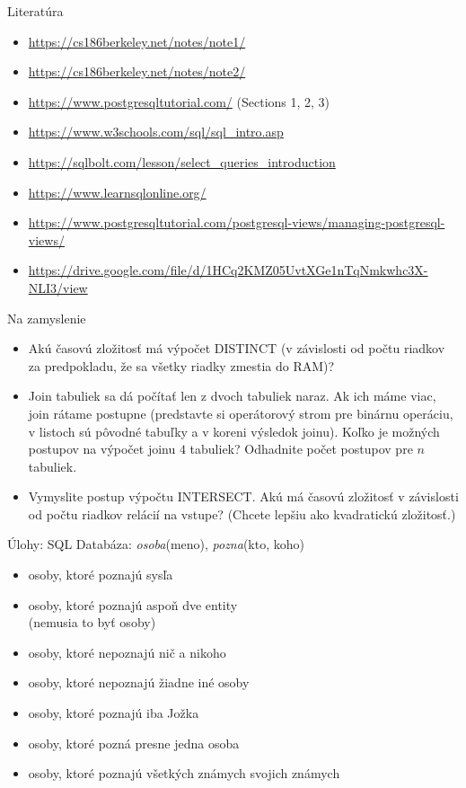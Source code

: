 \documentclass[12pt]{beamer}
\begin{document}
\begin{frame}{Literatúra}
\begin{itemize}
\item {\scriptsize\url{https://cs186berkeley.net/notes/note1/}}
\item {\scriptsize\url{https://cs186berkeley.net/notes/note2/}}
\item {\scriptsize\url{https://www.postgresqltutorial.com/} (Sections 1, 2, 3)}
\item {\scriptsize\url{https://www.w3schools.com/sql/sql_intro.asp}}
\item {\scriptsize\url{https://sqlbolt.com/lesson/select_queries_introduction}}
\item {\scriptsize\url{https://www.learnsqlonline.org/}}
\item {\scriptsize\url{https://www.postgresqltutorial.com/postgresql-views/managing-postgresql-views/}}
\item {\scriptsize\url{https://drive.google.com/file/d/1HCq2KMZ05UvtXGe1nTqNmkwhc3X-NLI3/view}}
\end{itemize}
\end{frame}


\begin{frame}{Na zamyslenie}
\begin{itemize}
\item Akú časovú zložitosť má výpočet DISTINCT (v závislosti od počtu riadkov za predpokladu, že sa všetky riadky zmestia do RAM)?
\item Join tabuliek sa dá počítať len z dvoch tabuliek naraz. Ak ich máme viac, join rátame postupne
    (predstavte si operátorový strom pre binárnu operáciu, v listoch sú pôvodné tabuľky a v koreni výsledok joinu).
    Koľko je možných postupov na výpočet joinu $4$ tabuliek? Odhadnite počet postupov pre $n$ tabuliek.
\item Vymyslite postup výpočtu INTERSECT. Akú má časovú zložitosť v závislosti od počtu riadkov relácií na vstupe? (Chcete lepšiu ako kvadratickú zložitosť.)
\end{itemize}
\end{frame}


\begin{frame}{Úlohy: SQL}
Databáza: \emph{osoba}(meno), \emph{pozna}(kto, koho)
\begin{itemize}
    \item osoby, ktoré poznajú sysľa
    \item osoby, ktoré poznajú aspoň dve entity\\ (nemusia to byť osoby)
    \item osoby, ktoré nepoznajú nič a nikoho
    \item osoby, ktoré nepoznajú žiadne iné osoby
    \item osoby, ktoré poznajú iba Jožka
    \item osoby, ktoré pozná presne jedna osoba
    \item osoby, ktoré poznajú všetkých známych svojich známych
\end{itemize}
\end{frame}
\end{document}
